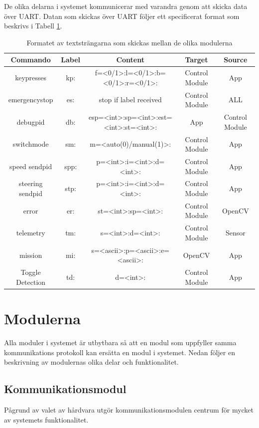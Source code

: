 \documentclass[10pt,oneside,swedish]{lips}
\begin{document}
De olika delarna i systemet kommunicerar med varandra genom att skicka data över UART. Datan som skickas över UART följer ett specificerat format som beskrivs i Tabell \ref{table:format}. 
\begin{table}[h!]
\centering

 \begin{tabular}{||c c c c c||} 
 \hline
 Commando & Label & Content & Target & Source\\ [0.5ex] 
 \hline\hline
 keypresses & kp: & f=<0/1>:l=<0/1>:b=<0/1>:r=<0/1>: & Control Module & App \\ 
 emergencystop & es: & stop if label received & Control Module & ALL \\
 debugpid & db: & esp=<int>:sp=<int>:est=<int>:st=<int>: & App & Control Module\\
 switchmode & sm: & m=<auto(0)/manual(1)>: & Control Module & App\\
 speed sendpid & spp: & p=<int>:i=<int>:d=<int>: & Control Module & App \\
 steering sendpid & stp: & p=<int>:i=<int>:d=<int>: & Control Module & App\\
 error & er: & st=<int>:sp=<int>: & Control Module & OpenCV\\
 telemetry & tm: & s=<int>:d=<int>: & Control Module & Sensor\\
 mission & mi: & s=<ascii>:p=<ascii>:e=<ascii>: & OpenCV & App\\
  Toggle Detection & td: & d=<int>:& Control Module & App\\[1ex] 
 \hline
 \end{tabular}
\caption{Formatet av textsträngarna som skickas mellan de olika modulerna}
\label{table:format}
\end{table}

\pagebreak
\section{Modulerna}
\label{sec:modulerna}
Alla moduler i systemet är utbytbara så att en modul som uppfyller samma kommunikations protokoll kan ersätta en modul i systemet. Nedan följer en beskrivning av modulernas olika delar och funktionalitet.

\subsection{Kommunikationsmodul}
Pågrund av valet av hårdvara utgör kommunikationsmodulen centrum för mycket av systemets funktionalitet.
\end{document}
